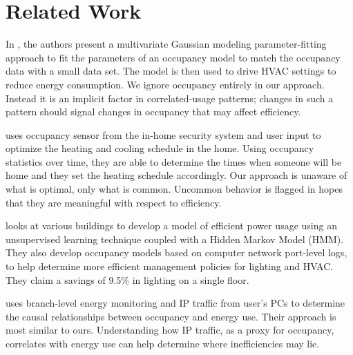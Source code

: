 \section{Related Work}

In \cite{occmodels_buildsys11}, the authors present a multivariate Gaussian modeling parameter-fitting 
approach to fit the parameters of an occupancy model to match the occupancy data with a small data set.  
The model is then used to drive HVAC settings to reduce energy consumption.  We ignore occupancy entirely 
in our approach.  Instead it is an implicit factor in correlated-usage patterns; changes in such a pattern 
should signal changes in occupancy that may affect efficiency.

\cite{kaminthermo} uses occupancy sensor from the in-home security system and user input to
optimize the heating and cooling schedule in the home.  Using occupancy statistics over time, they
are able to determine the times when someone will be home and they set the heating schedule accordingly.
Our approach is unaware of what is optimal, only what is common.  Uncommon behavior is flagged in hopes
that they are meaningful with respect to efficiency.

\cite{Bellala_buildsys11} looks at various buildings to develop a model of efficient power usage using 
an unsupervised learning technique coupled with a Hidden Markov Model (HMM).  They also develop occupancy models based on
computer network port-level logs, to help determine more efficient management policies for lighting and HVAC.  
They claim a savings of 9.5\% in lighting on a single floor.

\cite{kim:buildsys2010} uses branch-level energy monitoring and IP traffic from user's PCs to determine the
causal relationships between occupancy and energy use.  Their approach is most similar to ours.  Understanding how IP 
traffic, as a proxy for occupancy, correlates with energy use can help determine where inefficiencies may lie.



